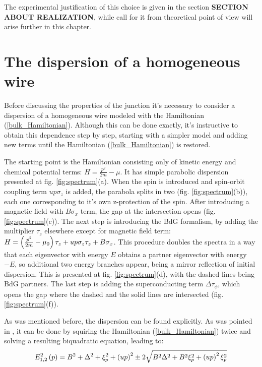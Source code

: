   The experimental justification of this choice is given in the section \textbf{SECTION ABOUT REALIZATION}, while call for it from theoretical point of view will arise further in this chapter.
  


\section{The dispersion of a homogeneous wire}

Before discussing the properties of the junction it's necessary to consider a dispersion of a homogeneous wire modeled with the Hamiltonian (\ref{bulk_Hamiltonian}). Although this can be done exactly, it's instructive to obtain this dependence step by step, starting with a simpler model and adding new terms until the Hamiltonian (\ref{bulk_Hamiltonian}) is restored.

The starting point is the Hamiltonian consisting only of kinetic energy and chemical potential terms: $ H =\frac{ p^2}{2m} - \mu$. It has simple parabolic dispersion presented at fig. \ref{fig:spectrum}(a). When the spin is introduced and spin-orbit coupling term $ up\sigma_z $ is added, the parabola splits in two (fig. \ref{fig:spectrum}(b)), each one corresponding to it's own z-protection of the spin. After introducing a magnetic field with $ B\sigma_x $ term, the gap at the intersection opens (fig. \ref{fig:spectrum}(c)). The next step is introducing the BdG formalism, by adding the multiplier $ \tau_z $ elsewhere except for magnetic field term:  $ 	H = \left(\frac{p^2}{2m} 	-\mu_0 \right)\tau_z +u p \sigma_z \tau_z + B\sigma_x	 $. This procedure doubles the spectra in a way that each eigenvector with energy $ E $ obtains a partner eigenvector with energy $ -E $, so additional two energy branches appear, being a mirror reflection of  initial dispersion. This is presented at fig. \ref{fig:spectrum}(d), with the dashed lines being BdG partners. The last step is adding the superconducting term $ \Delta\tau_\phi $, which opens the gap where the dashed and the solid lines are intersected (fig. \ref{fig:spectrum}(f)).

As was mentioned before, the dispersion can be found explicitly. As was pointed in \cite{Oreg_2010}, it can be done by squiring the Hamiltonian (\ref{bulk_Hamiltonian}) twice and solving a resulting biquadratic equation, leading to:
\begin{equation}
E^2_{1,2}\left(p\right)
=
B^2
+
\Delta^2
+
\xi_p^2
+
\left(up\right)^2
\pm	
2\sqrt{
	B^2 \Delta^2
	+
	B^2\xi_p^2
	+
	\left(up\right)^2\xi_p^2
}
\end{equation}

